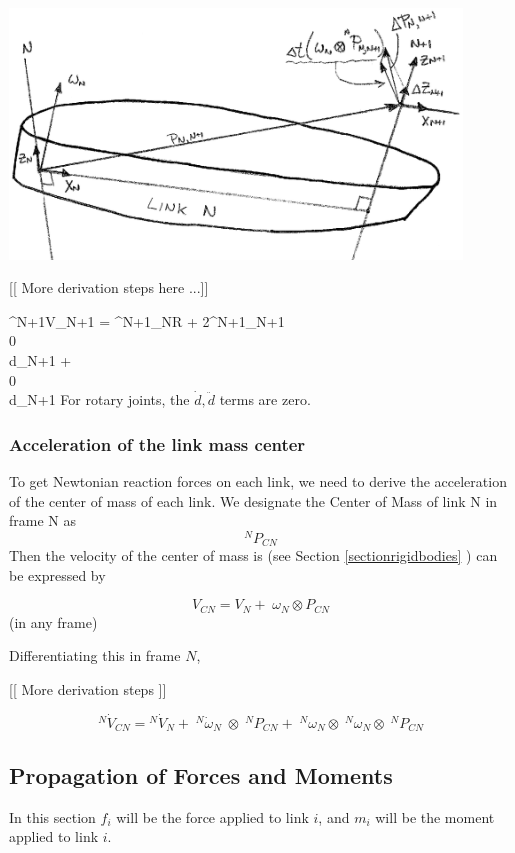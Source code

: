 \begin{center}
\includegraphics[width=120mm]{figs06/00918.eps}
\end{center}

[[ More derivation steps here ...]]

\bq
^{N+1}\dot V_{N+1} = {^{N+1}_NR}
+
2\:^{N+1}\omega_{N+1}\otimes{}\\0\\\dot d_{N+1} \emat + \\0\\\ddot d_{N+1} \emat
\eq
For rotary joints, the $\dot d, \ddot d$ terms are zero.

\subsubsection{Acceleration of the link mass center}
To get Newtonian reaction forces on each link, we need to derive the acceleration of the center of mass of each link.   We designate the Center of Mass of link N in frame N as
\[
^NP_{CN}
\]
Then the velocity of the center of mass is (see Section \ref{sectionrigidbodies} ) can be expressed by

\[
V_{CN} = V_N +\; \omega_N \otimes P_{CN}
\]
 (in any frame)

Differentiating this in frame $N$,

[[ More derivation steps ]]

\[
{^N\dot V_{CN}} = {^N \dot V_N}+\; {^N\dot\omega_N}\; \otimes \; {^NP_{CN}} + \; {^N\omega_N}\otimes \;  {^N\omega_N}\otimes\; {^NP_{CN}}
\]


\subsection{Propagation of Forces and Moments}
In this section $f_i$ will be the force applied to link $i$, and $m_i$ will be the moment applied to link $i$.

